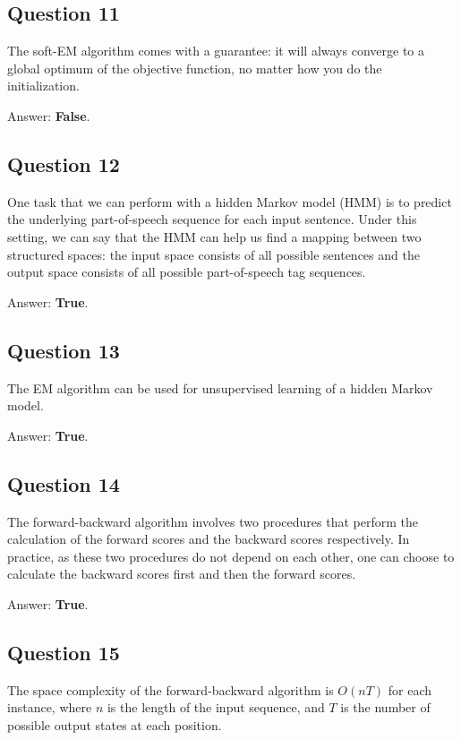 \documentclass[11pt,fancychapters]{article}
\begin{document}
\subsection*{Question 11 {\normalfont{[1 point]}}}

The soft-EM algorithm comes with a guarantee: it will always converge to a global optimum of the objective function, no matter how you do the initialization.

Answer: \textbf{False}.

\subsection*{Question 12 {\normalfont{[1 point]}}}

One task that we can perform with a hidden Markov model (HMM) is to predict the underlying part-of-speech sequence for each input sentence. Under this setting, we can say that the HMM can help us find a mapping between two structured spaces: the input space consists of all possible sentences and the output space consists of all possible part-of-speech tag sequences.

Answer: \textbf{True}.

\subsection*{Question 13 {\normalfont{[1 point]}}}

The EM algorithm can be used for unsupervised learning of a hidden Markov model.

Answer: \textbf{True}.

\subsection*{Question 14 {\normalfont{[1 point]}}}

The forward-backward algorithm involves two procedures that perform the calculation of the forward scores and the backward scores respectively. In practice, as these two procedures do not depend on each other, one can choose to calculate the backward scores first and then the forward scores.

Answer: \textbf{True}.

\subsection*{Question 15 {\normalfont{[1 point]}}}

The space complexity of the forward-backward algorithm is $O(nT)$ for each instance, where $n$ is the length of the input sequence, and $T$ is the number of possible output states at each position.
\end{document}
